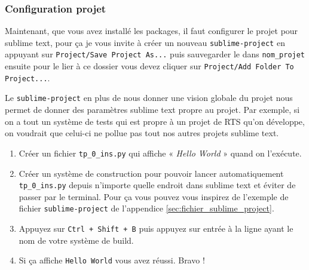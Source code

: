 \documentclass[a4paper,12pt]{article}
\begin{document}
\subsubsection{Configuration projet}

Maintenant, que vous avez installé les packages, il faut configurer le projet pour sublime text, pour ça je vous invite à créer un nouveau \texttt{sublime-project} en appuyant sur \texttt{Project/Save Project As...} puis sauvegarder le dans \texttt{nom\_projet} ensuite pour le lier à ce dossier vous devez cliquer sur \texttt{Project/Add Folder To Project...}.

Le \texttt{sublime-project} en plus de nous donner une vision globale du projet nous permet de donner des paramètres sublime text propre au projet. Par exemple, si on a tout un système de tests qui est propre à un projet de RTS qu'on développe, on voudrait que celui-ci ne pollue pas tout nos autres projets sublime text.    



\begin{enumerate}
     \item Créer un fichier \texttt{tp\_0\_ins.py} qui affiche « \textit{Hello World} » quand on l’exécute.
     \item Créer un système de construction pour pouvoir lancer automatiquement \texttt{tp\_0\_ins.py} depuis n'importe quelle endroit dans sublime text et éviter de passer par le terminal. Pour ça vous pouvez vous inspirez de l'exemple de fichier \texttt{sublime-project} de l'appendice \ref{sec:fichier_sublime_project}.
     \item Appuyez sur \texttt{Ctrl + Shift + B} puis appuyez sur entrée à la ligne ayant le nom de votre système de build.
     \item Si ça affiche \texttt{Hello World} vous avez réussi. Bravo !
 \end{enumerate} 


\newpage
\appendix
\end{document}
